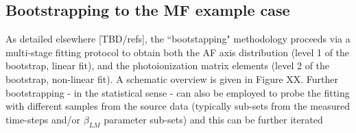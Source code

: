 \subsection{Bootstrapping to the MF example case}

As detailed elsewhere [TBD/refs], the ``bootstapping" methodology proceeds via a multi-stage fitting protocol to obtain both the AF axis distribution (level 1 of the bootstrap, linear fit), and the photoionization matrix elements (level 2 of the bootstrap, non-linear fit). A schematic overview is given in Figure XX. Further bootstrapping - in the statistical sense - can also be employed to probe the fitting with different samples from the source data (typically sub-sets from the measured time-steps and/or $\beta_{LM}$ parameter sub-sets) and this can be further iterated 